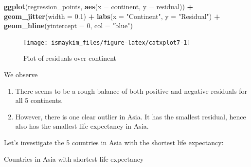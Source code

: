 \documentclass[12pt,]{krantz}
\makeatletter
\newenvironment{Shaded}{\begin{snugshade}}{\end{snugshade}}
\newcommand{\KeywordTok}[1]{\textcolor[rgb]{0.27,0.27,0.27}{\textbf{#1}}}
\newcommand{\DataTypeTok}[1]{\textcolor[rgb]{0.27,0.27,0.27}{#1}}
\newcommand{\DecValTok}[1]{\textcolor[rgb]{0.06,0.06,0.06}{#1}}
\newcommand{\FloatTok}[1]{\textcolor[rgb]{0.06,0.06,0.06}{#1}}
\newcommand{\StringTok}[1]{\textcolor[rgb]{0.5,0.5,0.5}{#1}}
\newcommand{\OperatorTok}[1]{\textcolor[rgb]{0.43,0.43,0.43}{\textbf{#1}}}
\newcommand{\NormalTok}[1]{#1}
\providecommand{\tightlist}{%
  \setlength{\itemsep}{0pt}\setlength{\parskip}{0pt}}
\newenvironment{kframe}{%
\medskip{}
\setlength{\fboxsep}{.8em}
 \def\at@end@of@kframe{}%
 \ifinner\ifhmode%
  \def\at@end@of@kframe{\end{minipage}}%
  \begin{minipage}{\columnwidth}%
 \fi\fi%
 \def\FrameCommand##1{\hskip\@totalleftmargin \hskip-\fboxsep
 \colorbox{shadecolor}{##1}\hskip-\fboxsep
     \hskip-\linewidth \hskip-\@totalleftmargin \hskip\columnwidth}%
 \MakeFramed {\advance\hsize-\width
   \@totalleftmargin\z@ \linewidth\hsize
   \@setminipage}}%
 {\par\unskip\endMakeFramed%
 \at@end@of@kframe}
\renewenvironment{Shaded}{\begin{kframe}}{\end{kframe}}
\makeatother
\begin{document}
\begin{Shaded}
\begin{Highlighting}[]
\KeywordTok{ggplot}\NormalTok{(regression_points, }\KeywordTok{aes}\NormalTok{(}\DataTypeTok{x =}\NormalTok{ continent, }\DataTypeTok{y =}\NormalTok{ residual)) }\OperatorTok{+}
\StringTok{  }\KeywordTok{geom_jitter}\NormalTok{(}\DataTypeTok{width =} \FloatTok{0.1}\NormalTok{) }\OperatorTok{+}\StringTok{ }
\StringTok{  }\KeywordTok{labs}\NormalTok{(}\DataTypeTok{x =} \StringTok{"Continent"}\NormalTok{, }\DataTypeTok{y =} \StringTok{"Residual"}\NormalTok{) }\OperatorTok{+}
\StringTok{  }\KeywordTok{geom_hline}\NormalTok{(}\DataTypeTok{yintercept =} \DecValTok{0}\NormalTok{, }\DataTypeTok{col =} \StringTok{"blue"}\NormalTok{)}
\end{Highlighting}
\end{Shaded}

\begin{figure}

{\centering \texttt{[image: ismaykim\_files/figure-latex/catxplot7-1]} 

}

\caption{Plot of residuals over continent}\label{fig:catxplot7}
\end{figure}

We observe

\begin{enumerate}
\def\labelenumi{\arabic{enumi}.}
\tightlist
\item
  There seems to be a rough balance of both positive and negative
  residuals for all 5 continents.
\item
  However, there is one clear outlier in Asia. It has the smallest
  residual, hence also has the smallest life expectancy in Asia.
\end{enumerate}

Let's investigate the 5 countries in Asia with the shortest life
expectancy:

\begin{Shaded}
\end{Shaded}

\label{tab:unnamed-chunk-205}Countries in Asia with shortest life expectancy
\end{document}
